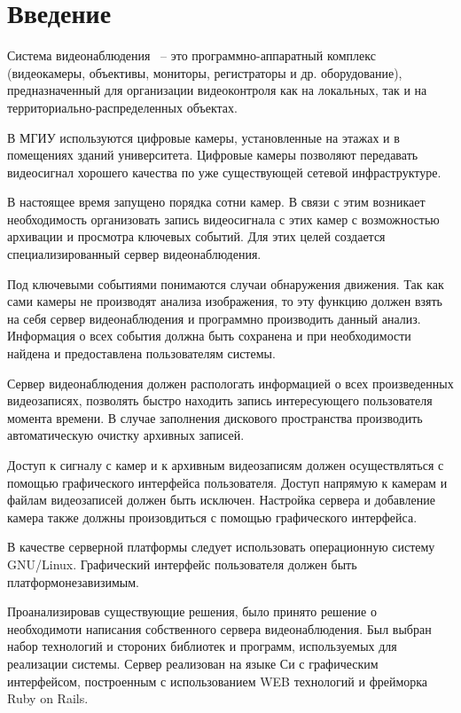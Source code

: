 \section{Введение}

Система видеонаблюдения ~-- это программно-аппаратный комплекс
(видеокамеры, объективы, мониторы, регистраторы и др. оборудование),
предназначенный для организации видеоконтроля как на локальных, так и на
территориально-распределенных объектах.

В МГИУ используются цифровые камеры, установленные на этажах и в помещениях зданий университета.
Цифровые камеры позволяют передавать видеосигнал хорошего качества по уже существующей
сетевой инфраструктуре.

В настоящее время запущено порядка сотни камер. В связи с этим возникает необходимость
организовать запись видеосигнала с этих камер с возможностью архивации и просмотра ключевых событий.
Для этих целей создается специализированный сервер видеонаблюдения.

Под ключевыми событиями понимаются случаи обнаружения движения. Так как сами камеры не производят
анализа изображения, то эту функцию должен взять на себя сервер видеонаблюдения и программно
производить данный анализ. Информация о всех события должна быть сохранена и при необходимости
найдена и предоставлена пользователям системы.

Сервер видеонаблюдения должен распологать информацией о всех произведенных видеозаписях,
позволять быстро находить запись интересующего пользователя момента времени. В случае заполнения
дискового пространства производить автоматическую очистку архивных записей.

Доступ к сигналу с камер и к архивным видеозаписям должен осуществляться с помощью графического
интерфейса пользователя. Доступ напрямую к камерам и файлам видеозаписей должен быть исключен.
Настройка сервера и добавление камера также должны произовдиться с помощью графического интерфейса.

В качестве серверной платформы следует использовать операционную систему GNU/Linux.
Графический интерфейс пользователя должен быть платформонезавизимым.

Проанализировав существующие решения, было принято решение о необходимоти написания
собственного сервера видеонаблюдения. Был выбран набор технологий и стороних библиотек и программ,
используемых для реализации системы. Сервер реализован на языке Си с графическим интерфейсом,
построенным с использованием WEB технологий и фрейморка Ruby on Rails.
